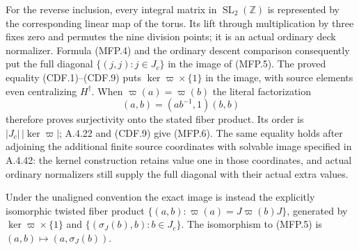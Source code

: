 For the reverse inclusion, every integral matrix in
$\operatorname{SL}_2(\mathbb Z)$ is represented by the corresponding
linear map of the torus.  Its lift through multiplication by three
fixes zero and permutes the nine division points; it is an actual
ordinary deck normalizer.  Formula (MFP.4) and the ordinary descent
comparison consequently put the full diagonal $\{(j,j):j\in J_c\}$
in the image of (MFP.5).  The proved equality (CDF.1)--(CDF.9) puts
$\ker\varpi\times\{1\}$ in the image, with source elements even
centralizing $H^\dagger$.  When $\varpi(a)=\varpi(b)$ the literal
factorization
\[
                   (a,b)=(ab^{-1},1)(b,b)
                                                               \tag{MFP.7}
\]
therefore proves surjectivity onto the stated fiber product.
Its order is $|J_c|\,|\ker\varpi|$; A.4.22 and (CDF.9) give (MFP.6).
The same equality holds after adjoining the additional finite source
coordinates with solvable image specified in A.4.42: the kernel
construction retains value one in those coordinates, and actual
ordinary normalizers still supply the full diagonal with their actual
extra values.

Under the unaligned convention the exact image is instead the
explicitly isomorphic twisted fiber product
$\{(a,b):\varpi(a)=J\varpi(b)J\}$, generated by
$\ker\varpi\times\{1\}$ and
$\{(\sigma_J(b),b):b\in J_c\}$.  The isomorphism to (MFP.5) is
$(a,b)\mapsto(a,\sigma_J(b))$.
